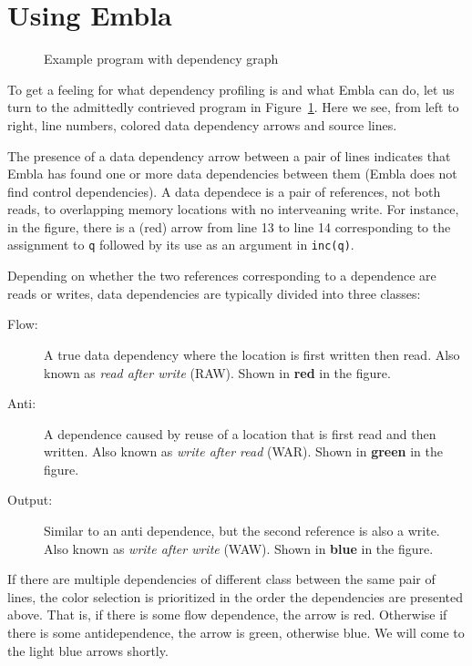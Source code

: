 \section{Using Embla}

\begin{figure} 
\small

\caption{Example program with dependency graph} \label{ffirstex}
\end{figure}

To get a feeling for what dependency profiling is and what Embla can do, 
let us turn to the admittedly contrieved program in Figure~\ref{ffirstex}. 
Here we see, from 
left to right, line numbers, colored data dependency arrows and source 
lines. 

The presence of a data dependency arrow between a pair of lines indicates
that Embla has found one or more data dependencies between them
(Embla does not find control dependencies). A data dependece is a pair
of references, not both reads, to overlapping memory
locations with no interveaning write. For instance, in the figure, 
there is a (red) arrow from line 13 to line 14 corresponding to
the assignment to {\tt q} followed by its use as an argument in 
{\tt inc(q)}.

Depending on whether the two references corresponding to a dependence
are reads or writes, data dependencies are typically divided into 
three classes:
\begin{description}
\item[Flow:]
A true data dependency where the location is first written then
read. Also known as {\em read after write} (RAW). Shown in 
{\bf \color{red} red} in the figure.
\item[Anti:]
A dependence caused by reuse of a location that is first read and then
written. Also known as {\em write after read} (WAR). Shown in 
{\bf \color{green} green} in the figure.
\item[Output:]
Similar to an anti dependence, but the second reference is also a
write. Also known as {\em write after write} (WAW). Shown in 
{\bf \color{blue} blue} in the figure.
\end{description}
If there are multiple dependencies of different class between the 
same pair of lines, the color selection is prioritized in the
order the dependencies are presented above. That is, if there is
some flow dependence, the arrow is red. Otherwise if there is 
some antidependence, the arrow is green, otherwise blue. We will 
come to the light blue arrows shortly.


